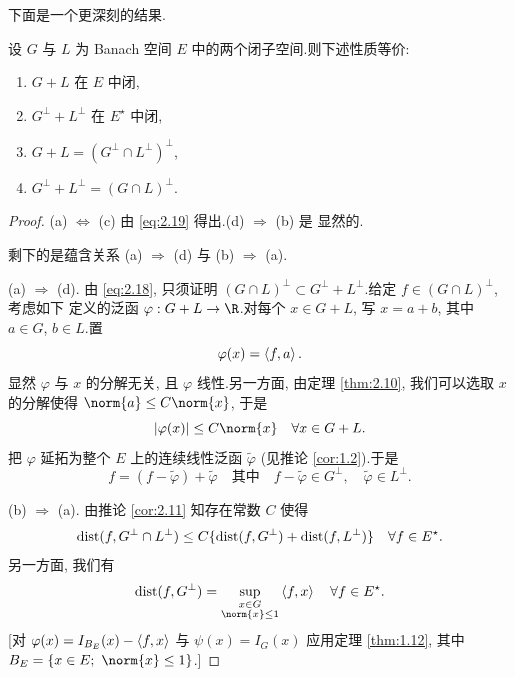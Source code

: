 下面是一个更深刻的结果.

\begin{startheorem}
\label{thm:2.16}
设 $G$ 与 $L$ 为 Banach 空间 $E$ 中的两个闭子空间.则下述性质等价:
\begin{enumerate}[label=(\alph*), leftmargin=2.0em, itemsep=0.15em]
	\item $G+L$ 在 $E$ 中闭,
	\item $G^\perp+L^\perp$ 在 $E^\star$ 中闭,
	\item $G+L=(G^\perp\cap L^\perp)^\perp$,
	\item $G^\perp+L^\perp=(G\cap L)^\perp$.
\end{enumerate}
\end{startheorem}

\begin{proof}
(a) $\Longleftrightarrow$ (c) 由 \eqref{eq:2.19} 得出.(d) $\Rightarrow$ (b) 是
显然的.

剩下的是蕴含关系 (a) $\Rightarrow$ (d) 与 (b) $\Rightarrow$ (a).

(a) $\Rightarrow$ (d). 由 \eqref{eq:2.18}, 只须证明
$(G\cap L)^\perp\subset G^\perp+L^\perp$.给定 $f\in(G\cap L)^\perp$, 考虑如下
定义的泛函 $\varphi:G+L\to\R$.对每个 $x\in G+L$, 写 $x=a+b$, 其中 $a\in G$, $b\in L$.置
\begin{equation*}
\varphi(x)=\left\langle f,a\right\rangle.
\end{equation*}
显然 $\varphi$ 与 $x$ 的分解无关, 且 $\varphi$ 线性.另一方面, 由定理
 \ref{thm:2.10}, 我们可以选取 $x$ 的分解使得 $\norm{a}\le C\norm{x}$, 于是
\begin{equation*}
\abs{\varphi(x)}\le C\norm{x}\quad \forall x\in G+L.
\end{equation*}
把 $\varphi$ 延拓为整个 $E$ 上的连续线性泛函 $\widetilde{\varphi}$ (见推论
 \ref{cor:1.2}).于是
\begin{equation*}
f=(f-\widetilde{\varphi})+\widetilde{\varphi}
\quad\text{其中}\quad f-\widetilde{\varphi}\in G^\perp,\quad
\widetilde{\varphi}\in L^\perp.
\end{equation*}

(b) $\Rightarrow$ (a). 由推论  \ref{cor:2.11} 知存在常数 $C$ 使得
\begin{equation}
\operatorname{dist}(f,G^\perp\cap L^\perp)\le C\{\operatorname{dist}(f,G^\perp)+\operatorname{dist}(f,L^\perp)\}
\quad \forall f\in E^\star.
\label{eq:2.20}
\end{equation}
另一方面, 我们有
\begin{equation}
\dist(f,G^\perp)=\sup_{\substack{x\in G\\ \norm{x}\le1}}\dual{f}{x}
\quad \forall f\in E^\star.
\label{eq:2.21}
\end{equation}
[对 $\varphi(x)=I_{B_E}(x)-\left\langle f,x\right\rangle$ 与 $\psi(x)=I_G(x)$ 应用定理
 \ref{thm:1.12}, 其中 $B_E=\{x\in E;\ \norm{x}\le1\}$.]


\end{proof}
